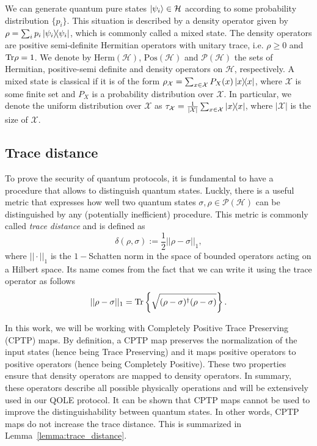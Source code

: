 We can generate quantum pure states $| \psi_i \rangle\in \mathcal{H}$ according to some probability distribution $\{p_i\}$. This situation is described by a density operator given by $\rho = \sum_i p_i \ketbra{\psi_i}$, which is commonly called a mixed state. The density operators are positive semi-definite Hermitian operators with unitary trace, i.e. $\rho \geq 0$ and $\text{Tr} \rho = 1$. We denote by $\text{Herm}(\mathcal{H})$, $\text{Pos}(\mathcal{H})$  and $\mathcal{P}(\mathcal{H})$ the sets of Hermitian, positive-semi definite and density operators on $\mathcal{H}$, respectively.
A mixed state is classical if it is of the form $\rho_{\mathcal{X}} = \sum_{x\in\mathcal{X}} P_X(x)\ketbra{x}$, where $\mathcal{X}$ is some finite set and $P_X$ is a probability distribution over $\mathcal{X}$. In particular, we denote the uniform distribution over $\mathcal{X}$ as $\tau_{\mathcal{X}} = \frac{1}{|\mathcal{X}|}\sum_{x\in\mathcal{X}}\ketbra{x}$, where $|\mathcal{X}|$ is the size of $\mathcal{X}$.


\subsection{Trace distance}

To prove the security of quantum protocols, it is fundamental to have a procedure that allows to distinguish quantum states. Luckly, there is a useful metric that expresses how well two quantum states $\sigma, \rho \in \mathcal{P}(\mathcal{H})$ can be distinguished by any (potentially inefficient) procedure. This metric is commonly called \textit{trace distance} and is defined as \cite{U17}
\begin{equation*}
    \delta(\rho,\sigma):=\frac{1}{2}||\rho-\sigma||_1,
\end{equation*}
where $||\cdot||_1$ is the $1-$Schatten norm in the space of bounded operators acting on a Hilbert space. Its name comes from the fact that we can write it using the trace operator as follows
\begin{equation*}
    ||\rho-\sigma||_1=\Tr\left\{\sqrt{(\rho-\sigma)^\dagger(\rho-\sigma)}\right\}.
\end{equation*}

In this work, we will be working with Completely Positive Trace Preserving (CPTP) maps. By definition, a CPTP map preserves the normalization of the input states (hence being Trace Preserving) and it maps positive operators to positive operators (hence being Completely Positive). These two properties ensure that density operators are mapped to density operators. In summary, these operators describe all possible physically operations and will be extensively used in our QOLE protocol. It can be shown that CPTP maps cannot be used to improve the distinguishability between quantum states. In other words, CPTP maps do not increase the trace distance. This is summarized in Lemma~\ref{lemma:trace_distance}.



